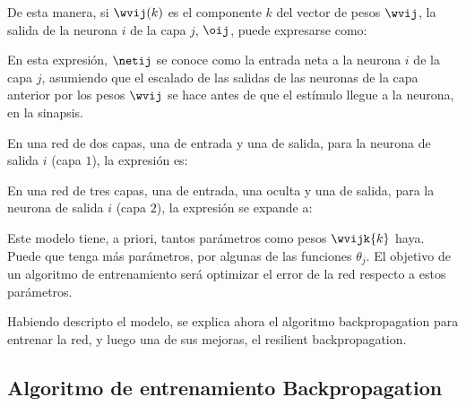 De esta manera, si $\wvij(k)$ es el componente $k$ del vector de pesos $\wvij$, la salida de la neurona $i$ de la capa $j$, $\oij$, puede expresarse como:


En esta expresión, $\netij$ se conoce como la entrada neta a la neurona $i$ de la capa $j$, asumiendo que el escalado de las salidas de las neuronas de la capa anterior por los pesos $\wvij$ se hace antes de que el estímulo llegue a la neurona, en la sinapsis. 


En una red de dos capas, una de entrada y una de salida, para la neurona de salida $i$ (capa $1$), la expresión es:


En una red de tres capas, una de entrada, una oculta y una de salida, para la neurona de salida $i$ (capa $2$), la expresión se expande a:




Este modelo tiene, a priori, tantos parámetros como pesos $\wvijk{k}$ haya. Puede que tenga más parámetros, por algunas de las funciones $\theta_j$. El objetivo de un algoritmo de entrenamiento será optimizar el error de la red respecto a estos parámetros.

Habiendo descripto el modelo, se explica ahora el algoritmo backpropagation para entrenar la red, y luego una de sus mejoras, el resilient backpropagation.

\subsection{Algoritmo de entrenamiento Backpropagation}


